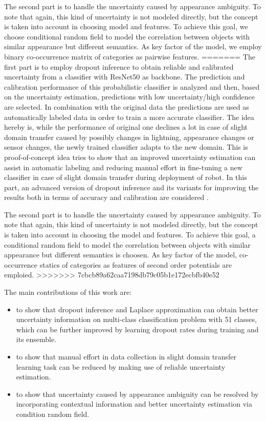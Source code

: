 The second part is to handle the uncertainty caused by appearance ambiguity. To note that again, this kind of uncertainty is not modeled directly, but the concept is taken into account in choosing model and features. To achieve this goal, we choose conditional random field to model the correlation between objects with similar appearance but different semantics. As key factor of the model, we employ binary co-occurrence matrix of categories as pairwise features.
=======
The first part is to employ dropout inference to obtain reliable and calibrated uncertainty from a classifier with ResNet50\cite{he2016deep} as backbone. The prediction and calibration performance of this probabilistic classifier is analyzed and then, based on the uncertainty estimation, predictions with low uncertainty/high confidence are selected. In combination with the original data the predictions are used as automatically labeled data in order to train a more accurate classifier. The idea hereby is, while the performance of original one declines a lot in case of slight domain transfer caused by possibly changes in lightning, appearance changes or sensor changes, the newly trained classifier adapts to the new domain. This is proof-of-concept idea tries to show that an improved uncertainty estimation can assist in automatic labeling and reducing manual effort in fine-tuning a new classifier in case of slight domain transfer during deployment of robot. In this part, an advanced version of dropout inference and its variants for improving the results both in terms of accuracy and calibration are considered . 

The second part is to handle the uncertainty caused by appearance ambiguity. To note that again, this kind of uncertainty is not modeled directly, but the concept is taken into account in choosing the model and features. To achieve this goal, a conditional random field to model the correlation between objects with similar appearance but different semantics is choosen. As key factor of the model, co-occurrence statics of categories as features of second order potentials are emploied.
>>>>>>> 7cbcb89a62caa7198db79c05b1e172ecbfb40e52

The main contributions of this work are:
\begin{itemize}
<<<<<<< HEAD
 \item to show that dropout inference and Laplace approximation can obtain better uncertainty information on multi-class classification problem with 51 classes, which can be further improved by learning dropout rates during training and its ensemble.
 
 \item to show that manual effort in data collection in slight domain transfer learning task can be reduced by making use of reliable uncertainty estimation.
 
 \item to show that uncertainty caused by appearance ambiguity can be resolved by incorporating contextual information and better uncertainty estimation via condition random field.
 
 
\end{itemize}

